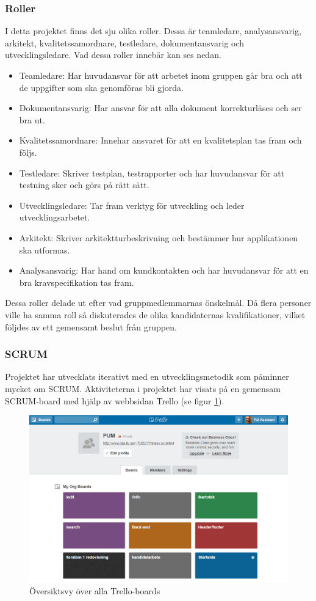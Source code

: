 \documentclass{article}
\begin{document}
\subsubsection{Roller}
I detta projektet finns det sju olika roller. Dessa är teamledare, analysansvarig, arkitekt, kvalitetssamordnare, testledare, dokumentansvarig och utvecklingsledare. Vad dessa roller innebär kan ses nedan. 
\begin{itemize}
\item Teamledare: Har huvudansvar för att arbetet inom gruppen går bra och att de uppgifter som ska genomföras bli gjorda. 
\item Dokumentansvarig: Har ansvar för att alla dokument korrekturläses och ser bra ut. 
\item Kvalitetssamordnare: Innehar ansvaret för att en kvalitetsplan tas fram och följs. 
\item Testledare: Skriver testplan, testrapporter och har huvudansvar för att testning sker och görs på rätt sätt.
\item Utvecklingsledare: Tar fram verktyg för utveckling och leder utvecklingsarbetet.
\item Arkitekt: Skriver arkitektturbeskrivning och bestämmer hur applikationen ska utformas.
\item Analysansvarig: Har hand om kundkontakten och har huvudansvar för att en bra kravspecifikation tas fram.
\end{itemize}
Dessa roller delade ut efter vad gruppmedlemmarnas önskelmål. Då flera personer ville ha samma roll så diskuterades de olika kandidaternas kvalifikationer, vilket följdes av ett gemensamt beslut från gruppen.

\subsubsection{SCRUM}
Projektet har utvecklats iterativt med en utvecklingsmetodik som påminner mycket om SCRUM. Aktiviteterna i projektet har visats på en gemensam SCRUM-board med hjälp av webbsidan Trello (se figur \ref{fig:trello}). 

\begin{figure}[htbp]
	\begin{center}
	\includegraphics[scale=0.4]{trello.png}
	\caption{Översiktsvy över alla Trello-boards}
	\label{fig:trello}
	\end{center}
\end{figure}
\end{document}
